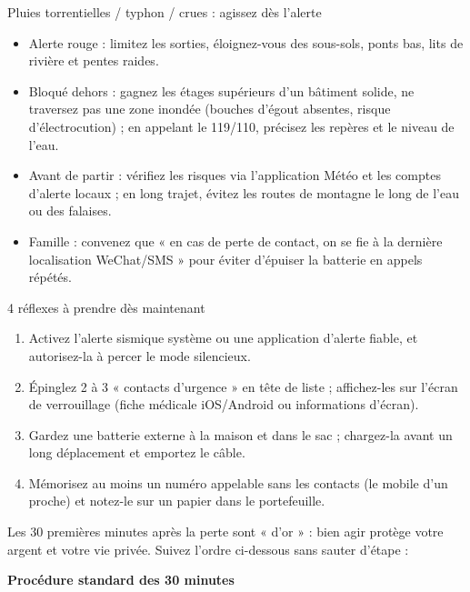 \begin{tcbwarn}{Pluies torrentielles / typhon / crues : agissez dès l'alerte}
\begin{itemize}
  \item Alerte rouge : limitez les sorties, éloignez-vous des sous-sols, ponts bas, lits de rivière et pentes raides.
  \item Bloqué dehors : gagnez les étages supérieurs d'un bâtiment solide, ne traversez pas une zone inondée (bouches d'égout absentes, risque d'électrocution) ; en appelant le 119/110, précisez les repères et le niveau de l'eau.
  \item Avant de partir : vérifiez les risques via l'application Météo et les comptes d'alerte locaux ; en long trajet, évitez les routes de montagne le long de l'eau ou des falaises.
  \item Famille : convenez que « en cas de perte de contact, on se fie à la dernière localisation WeChat/SMS » pour éviter d'épuiser la batterie en appels répétés.
\end{itemize}

\end{tcbwarn}

\begin{tcbpractice}{4 réflexes à prendre dès maintenant}
\begin{enumerate}
  \item Activez l'alerte sismique système ou une application d'alerte fiable, et autorisez-la à percer le mode silencieux.
  \item Épinglez 2 à 3 « contacts d'urgence » en tête de liste ; affichez-les sur l'écran de verrouillage (fiche médicale iOS/Android ou informations d'écran).
  \item Gardez une batterie externe à la maison et dans le sac ; chargez-la avant un long déplacement et emportez le câble.
  \item Mémorisez au moins un numéro appelable sans les contacts (le mobile d'un proche) et notez-le sur un papier dans le portefeuille.
\end{enumerate}

\end{tcbpractice}


Les 30 premières minutes après la perte sont « d'or » : bien agir protège votre argent et votre vie privée. Suivez l'ordre ci-dessous sans sauter d'étape :

\textbf{Procédure standard des 30 minutes}\par

